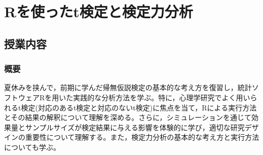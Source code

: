 \section{Rを使ったt検定と検定力分析}
\label{b16_ttest_R}

\subsection{授業内容}
\subsubsection{概要}
夏休みを挟んで，前期に学んだ帰無仮説検定の基本的な考え方を復習し，統計ソフトウェアRを用いた実践的な分析方法を学ぶ。特に，心理学研究でよく用いられるt検定(対応のあるt検定と対応のないt検定)に焦点を当て，Rによる実行方法とその結果の解釈について理解を深める。さらに，シミュレーションを通じて効果量とサンプルサイズが検定結果に与える影響を体験的に学び，適切な研究デザインの重要性について理解する。また，検定力分析の基本的な考え方と実行方法についても学ぶ。

